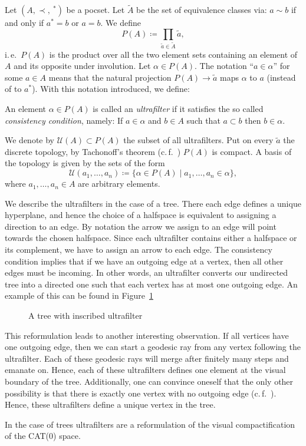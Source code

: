 \begin{defin}[Ultrafilter]
  Let \((A, \prec, \ ^\ast)\) be a pocset. Let \(\tilde A\) be the set of equivalence classes via: \(a \sim b\) if and only if \(a^\ast = b\) or \(a = b\). We define
  \[
    P(A) \coloneqq \prod_{\tilde a \in \tilde A} \tilde a,
  \]
  i.\,e.\ \(P(A)\) is the product over all the two element sets containing an element of \(A\) and its opposite under involution. Let \(\alpha \in P(A)\). The notation \enquote{\(a \in \alpha\)} for some \(a \in A\) means that the natural projection \(P(A) \to \tilde a\) maps \(\alpha\) to \(a\) (instead of to \(a^\ast\)). With this notation introduced, we define:
  
  An element \(\alpha \in P(A)\) is called an \emph{ultrafilter} if it satisfies the so called \emph{consistency condition}, namely: If \(a \in \alpha\) and \(b \in A\) such that \(a \subset b\) then \(b \in \alpha\).

  We denote by \(\mathcal{U}(A) \subset P(A)\) the subset of all ultrafilters. Put on every \(\tilde a\) the discrete topology, by Tachonoff's theorem (c.\,f.\ \cite[Chapter~10]{MR1275831}) \(P(A)\) is compact. A basis of the topology is given by the sets of the form
\[
  \mathcal{U}(a_1,\dots, a_n) \coloneqq \{\alpha \in P(A) \mid a_1, \dots, a_n \in \alpha\},
\]
where \(a_1,\dots, a_n \in A\) are arbitrary elements.
\end{defin}

\begin{bsp}[Trees]
  We describe the ultrafilters in the case of a tree. There each edge defines a unique hyperplane, and hence the choice of a halfspace is equivalent to assigning a direction to an edge. By notation the arrow we assign to an edge will point towards the chosen halfspace. Since each ultrafilter contains either a halfspace or its complement, we have to assign an arrow to each edge. The consistency condition implies that if we have an outgoing edge at a vertex, then all other edges must be incoming. In other words, an ultrafilter converts our undirected tree into a directed one such that each vertex has at most one outgoing edge. An example of this can be found in Figure~\ref{fig:ultrafilter}
  \begin{figure}[htbp]
    \centering
    
    \caption{A tree with inscribed ultrafilter}
    \label{fig:ultrafilter}
  \end{figure}

  This reformulation leads to another interesting observation. If all vertices have one outgoing edge, then we can start a geodesic ray from any vertex following the ultrafilter. Each of these geodesic rays will merge after finitely many steps and emanate on. Hence, each of these ultrafilters defines one element at the visual boundary of the tree. Additionally, one can convince oneself that the only other possibility is that there is exactly one vertex with no outgoing edge (c.\,f.~\cite[14]{sageev-lecture-notes}). Hence, these ultrafilters define a unique vertex in the tree.

  In the case of trees ultrafilters are a reformulation of the visual compactification of the CAT(0) space. 
\end{bsp}

